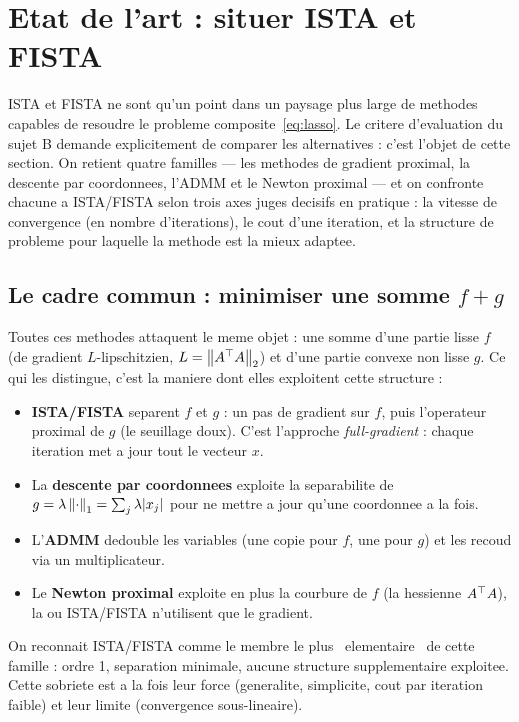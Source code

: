 %
\section{Etat de l'art : situer ISTA et FISTA}
\label{sec:etatart}

ISTA et FISTA ne sont qu'un point dans un paysage plus large de methodes
capables de resoudre le probleme composite~\eqref{eq:lasso}. Le critere
d'evaluation du sujet B demande explicitement de comparer les alternatives :
c'est l'objet de cette section. On retient quatre familles --- les methodes de
gradient proximal, la descente par coordonnees, l'ADMM et le Newton proximal ---
et on confronte chacune a ISTA/FISTA selon trois axes juges decisifs en
pratique : la vitesse de convergence (en nombre d'iterations), le cout d'une
iteration, et la structure de probleme pour laquelle la methode est la mieux
adaptee.

\subsection{Le cadre commun : minimiser une somme $f + g$}

Toutes ces methodes attaquent le meme objet : une somme d'une partie lisse $f$
(de gradient $L$-lipschitzien, $L = \left\lVert A^{\top} A \right\rVert_2$) et d'une partie convexe non
lisse $g$. Ce qui les distingue, c'est la maniere dont elles exploitent cette
structure :
\begin{itemize}
  \item \textbf{ISTA/FISTA} separent $f$ et $g$ : un pas de gradient sur $f$,
        puis l'operateur proximal de $g$ (le seuillage doux). C'est l'approche
        \emph{full-gradient} : chaque iteration met a jour tout le vecteur $x$.
  \item La \textbf{descente par coordonnees} exploite la separabilite de
        $g = \lambda\left\lVert \cdot \right\rVert_1 = \sum_j \lambda |x_j|$ pour ne mettre a jour
        qu'une coordonnee a la fois.
  \item L'\textbf{ADMM} dedouble les variables (une copie pour $f$, une pour $g$)
        et les recoud via un multiplicateur.
  \item Le \textbf{Newton proximal} exploite en plus la courbure de $f$ (la
        hessienne $A^{\top} A$), la ou ISTA/FISTA n'utilisent que le gradient.
\end{itemize}
On reconnait ISTA/FISTA comme le membre le plus \guillemotleft{}~elementaire~\guillemotright{} de cette
famille : ordre 1, separation minimale, aucune structure supplementaire
exploitee. Cette sobriete est a la fois leur force (generalite, simplicite, cout
par iteration faible) et leur limite (convergence sous-lineaire).

